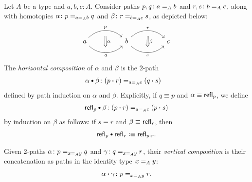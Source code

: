 \begin{defn}
    Let $A$ be a type and $a,b,c\colon A$. Consider paths $p,q\colon a\eq Ab$ and $r,s \colon b\eq Ac$, along with homotopies $\alpha\colon p\eq{a\eq Ab}q$ and $\beta\colon r\eq{b\eq Ac}s$, as depicted below:
    \[
        \begin{tikzcd}[column sep=huge,row sep=large]
            a 
                \arrow[r,bend left=45,"p"{name=U1}]
                \arrow[r,bend right=45,"q"'{name=D1}]
            &b
                \arrow[r,bend left=45,"r"{name=U2}]
                \arrow[r,bend right=45,"s"'{name=D2}]
            &c
                \arrow[Rightarrow,from=U1,to=D1,"\alpha", 
                    shorten <= 8pt,shorten >= 8pt]
                \arrow[Rightarrow,from=U2,to=D2,"\beta", 
                    shorten <= 8pt,shorten >= 8pt]
        \end{tikzcd}
    \]
    The \textsl{horizontal composition} of $\alpha$ and $\beta$ is the $2$-path
    \begin{align*}
        \alpha\hct\beta&\colon(p\ct r)\eq{a\eq Ac}(q\ct s)        
    \end{align*}
    defined by path induction on $\alpha$ and $\beta$. Explicitly, if $q\equiv p$ and $\alpha\equiv\mathsf{refl}_p$, we define
    \begin{align*}
        \fun{refl}_p\hct\beta\colon(p\ct r)\eq{a\eq Ac}(p\ct s)
    \end{align*}
    by induction on $\beta$ as follows: if $s\equiv r$ and $\beta\equiv\mathsf{refl}_r$, then
    \begin{equation}\label{eq:refl-hct}
        \fun{refl}_p\hct\fun{refl}_r\defeq\fun{refl}_{p\ct r}.
    \end{equation}
\end{defn}

\begin{defn}
    Given 2-paths $\alpha\colon p\eq{x\eq A y} q$ and $\gamma\colon q\eq{x\eq A y} r$, their \textsl{vertical composition} is their concatenation as paths in the identity type $x\mathrel{=_{A}} y$:
    \[
        \alpha\ct\gamma \colon p\eq{x\eq A y} r.
    \]
\end{defn}

